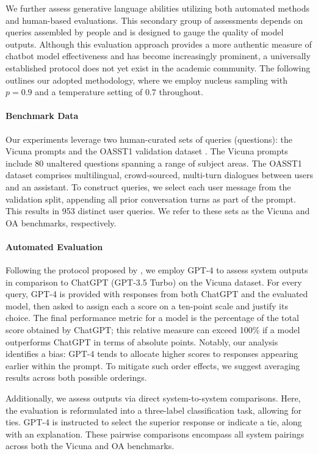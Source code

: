 We further assess generative language abilities utilizing both automated methods and human-based evaluations. This secondary group of assessments depends on queries assembled by people and is designed to gauge the quality of model outputs. Although this evaluation approach provides a more authentic measure of chatbot model effectiveness and has become increasingly prominent, a universally established protocol does not yet exist in the academic community. The following outlines our adopted methodology, where we employ nucleus sampling with $p=0.9$ and a temperature setting of $0.7$ throughout.

\paragraph{Benchmark Data} Our experiments leverage two human-curated sets of queries (questions): the Vicuna prompts \citep{vicuna2023} and the OASST1 validation dataset \citep{kopf2023openassistant}. The Vicuna prompts include 80 unaltered questions spanning a range of subject areas. The OASST1 dataset comprises multilingual, crowd-sourced, multi-turn dialogues between users and an assistant. To construct queries, we select each user message from the validation split, appending all prior conversation turns as part of the prompt. This results in 953 distinct user queries. We refer to these sets as the Vicuna and OA benchmarks, respectively.

\paragraph{Automated Evaluation} Following the protocol proposed by \citet{vicuna2023}, we employ GPT-4 to assess system outputs in comparison to ChatGPT (GPT-3.5 Turbo) on the Vicuna dataset. For every query, GPT-4 is provided with responses from both ChatGPT and the evaluated model, then asked to assign each a score on a ten-point scale and justify its choice. The final performance metric for a model is the percentage of the total score obtained by ChatGPT; this relative measure can exceed 100\% if a model outperforms ChatGPT in terms of absolute points. Notably, our analysis identifies a bias: GPT-4 tends to allocate higher scores to responses appearing earlier within the prompt. To mitigate such order effects, we suggest averaging results across both possible orderings.

Additionally, we assess outputs via direct system-to-system comparisons. Here, the evaluation is reformulated into a three-label classification task, allowing for ties. GPT-4 is instructed to select the superior response or indicate a tie, along with an explanation. These pairwise comparisons encompass all system pairings across both the Vicuna and OA benchmarks.


